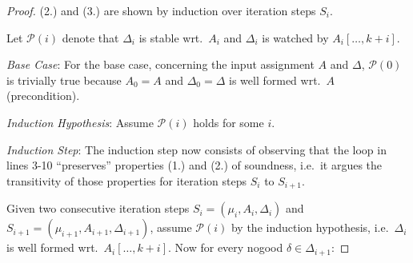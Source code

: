 \documentclass{vutinfth} %
\theoremstyle{example}
\theoremstyle{definition}
\theoremstyle{theorem}
\theoremstyle{lemma}
\theoremstyle{corollary}
\newcommand{\ass}{A}
\newcommand{\fabef}{\ass_{i}}
\newcommand{\abef}{\fabef[\ldots, k + i]}
\newcommand{\dbef}{\Delta_{i}}
\newcommand{\daf}{\Delta_{i+1}}
\newcommand{\welf}{well formed\xspace}
\newcommand{\upinv}{stable\xspace}
\newcommand{\lowinv}{watched\xspace}
\newcommand{\sgl}{\mu}
\begin{document}
\begin{proof}
(2.) and (3.) are shown by induction over iteration steps $S_i$.

Let $\mathcal{P}(i)$ denote that $\dbef$ is \upinv wrt.~$\ass_i$ and $\dbef$ is \lowinv by $\abef$.

\emph{Base Case}: For the base case, concerning the input assignment $\ass$ and $\Delta$, $\mathcal{P}(0)$ is trivially true because $\ass_0 = \ass$ and $\Delta_0 = \Delta$ is \welf wrt.~$\ass$ (precondition).

\emph{Induction Hypothesis}: Assume $\mathcal{P}(i)$ holds for some $i$.

\emph{Induction Step}: The induction step now consists of observing that the loop in lines 3-10 \enquote{preserves} properties (1.) and (2.) of soundness, i.e.~it argues the transitivity of those properties for iteration steps $S_{i}$ to $S_{i+1}$.


Given two consecutive iteration steps $S_{i} = (\sgl_{i}, \ass_{i}, \Delta_{i})$ and $S_{i+1} = (\sgl_{i+1}, \ass_{i+1}, \Delta_{i+1})$, assume $\mathcal{P}(i)$ by the induction hypothesis, i.e.~$\dbef$ is \welf wrt.~$\abef$. Now for every nogood $\delta \in \daf$:


\end{proof}
\end{document}
